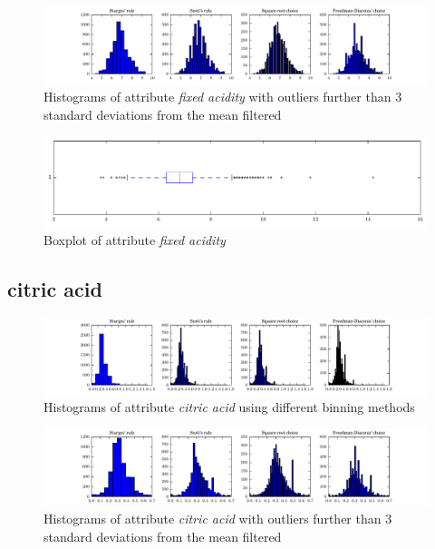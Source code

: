 \documentclass{report}
\begin{document}
\begin{figure}[H]
\includegraphics[width=\textwidth]{histograms/fixed_acidity_filtered.pdf}
\caption{Histograms of attribute \emph{fixed acidity} with outliers further than 3 standard deviations from the mean filtered}\n\end{figure}

\begin{figure}[H]
\includegraphics[width=\textwidth]{boxplots/fixed_acidity.pdf}
\caption{Boxplot of attribute \emph{fixed acidity}}\end{figure}

\newpage\subsection{citric acid}
\begin{figure}[H]
\includegraphics[width=\textwidth]{histograms/citric_acid.pdf}
\caption{Histograms of attribute \emph{citric acid} using different binning methods}\end{figure}

\begin{figure}[H]
\includegraphics[width=\textwidth]{histograms/citric_acid_filtered.pdf}
\caption{Histograms of attribute \emph{citric acid} with outliers further than 3 standard deviations from the mean filtered}\n\end{figure}
\end{document}
